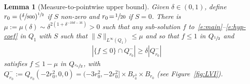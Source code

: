 \documentclass[JEP,XML,SOM,Unicode,NoFloatCountersInSection,published]{cedram}
\newtheorem{lemma}[theorem]{Lemma}
\theoremstyle{definition}
\theoremstyle{remark}
\begin{document}
\begin{lemma}[Measure-to-pointwise upper bound]
\label{l:increase}
Given $\delta \in (0,1)$, define
$r_0 = (\sfrac{\delta}{800})^{\sfrac12}$ if $S$ non-zero and
$r_0\!=\!\sfrac{1}{20}$ if $S\!=\!0$. There is
\hbox{$\mu\!:=\!\mu(\delta)\sim \delta^{2 (1+\delta^{-10d-16})}\!>\!0$} such
that any sub-solution $f$ to~\eqref{e:main}--\eqref{e:hyp-coef}
in $Q_1$ with $S$ such that
$\| S\|_{L^{\infty}(Q_1)}\le \mu$ and so that $f\leq 1$ in
$Q_{\sfrac{1}{2}}$ and
\begin{align}
\label{eq:measure-hyp-pointwise}
\left| \{ f \leq 0 \} \cap Q_{r_0}^- \right| \ge \delta
\left| Q_{r_0}^- \right|
\end{align}
satisfies $f \le 1-\mu$ in $Q_{\sfrac{r_0}{2}}$, with
$Q_{r_0}^{-} := Q_{r_0}(-2r_0^2,0,0) =(-3r_0^2,-2r_0^2] \times
B_{r_0^3} \times B_{r_0}$ (see Figure~\ref{fig:LVI}).
\end{lemma}
\end{document}

